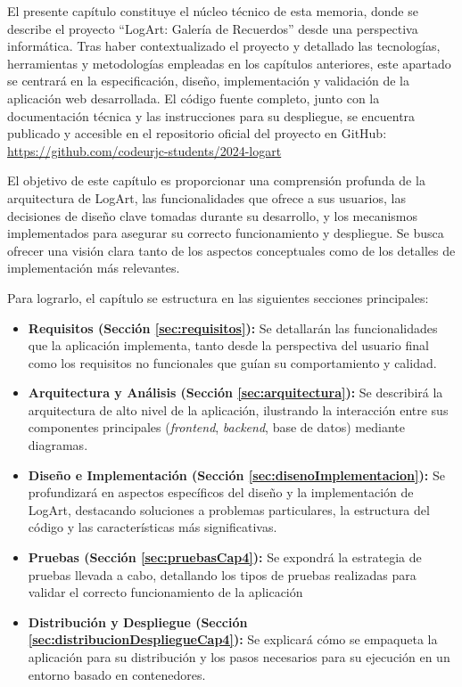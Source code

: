 El presente capítulo constituye el núcleo técnico de esta memoria, donde se describe el proyecto ``LogArt: Galería de Recuerdos'' desde una perspectiva informática. Tras haber contextualizado el proyecto y detallado las tecnologías, herramientas y metodologías empleadas en los capítulos anteriores, este apartado se centrará en la especificación, diseño, implementación y validación de la aplicación web desarrollada. El código fuente completo, junto con la documentación técnica y las instrucciones para su despliegue, se encuentra publicado y accesible en el repositorio oficial del proyecto en GitHub: \url{https://github.com/codeurjc-students/2024-logart}

El objetivo de este capítulo es proporcionar una comprensión profunda de la arquitectura de LogArt, las funcionalidades que ofrece a sus usuarios, las decisiones de diseño clave tomadas durante su desarrollo, y los mecanismos implementados para asegurar su correcto funcionamiento y despliegue. Se busca ofrecer una visión clara tanto de los aspectos conceptuales como de los detalles de implementación más relevantes.

Para lograrlo, el capítulo se estructura en las siguientes secciones principales:
\begin{itemize}
    \item \textbf{Requisitos (Sección \ref{sec:requisitos}):} Se detallarán las funcionalidades que la aplicación implementa, tanto desde la perspectiva del usuario final como los requisitos no funcionales que guían su comportamiento y calidad.
    \item \textbf{Arquitectura y Análisis (Sección \ref{sec:arquitectura}):} Se describirá la arquitectura de alto nivel de la aplicación, ilustrando la interacción entre sus componentes principales (\textit{frontend}, \textit{backend}, base de datos) mediante diagramas.
    \item \textbf{Diseño e Implementación (Sección \ref{sec:disenoImplementacion}):} Se profundizará en aspectos específicos del diseño y la implementación de LogArt, destacando soluciones a problemas particulares, la estructura del código y las características más significativas.
    \item \textbf{Pruebas (Sección \ref{sec:pruebasCap4}):} Se expondrá la estrategia de pruebas llevada a cabo, detallando los tipos de pruebas realizadas para validar el correcto funcionamiento de la aplicación
    \item \textbf{Distribución y Despliegue (Sección \ref{sec:distribucionDespliegueCap4}):} Se explicará cómo se empaqueta la aplicación para su distribución y los pasos necesarios para su ejecución en un entorno basado en contenedores.
\end{itemize}

